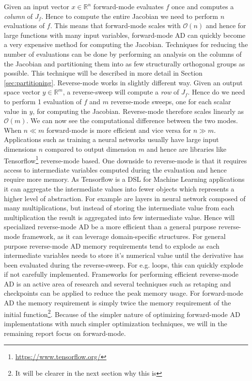     Given an input vector $x \in \mathbb{R}^n$  forward-mode evaluates $f$ once and
	computes a \emph{column} of $J_f$. Hence to compute the entire Jacobian we need 
	to perform $n$ evaluations of $f$. This means that forward-mode scales with $\mathcal{O}(n)$
	and hence for  large functions with many input variables, forward-mode AD can quickly become a very 
	expensive method for computing the Jacobian. 
	Techniques for reducing the number of evaluations can be done by performing an
	analysis on the columns of the Jacobian and partitioning them into as few structurally orthogonal groups as
	possible.
	This technique will be described in more detail in Section \ref{sec:partitioning}.\newline 
	Reverse-mode works in slightly different way. 
	Given an output space vector $y
	\in \mathbb{R}^m$, a reverse-sweep will compute a
	\emph{row} of $J_f$. Hence do we need to perform 1 evaluation of $f$ and $m$
	reverse-mode sweeps, one for each scalar value in $y$, for computing the Jacobian. 
	Reverse-mode therefore scales linearly as $\mathcal{O}(m)$.  
	We can now see the computational difference between the two modes. When $n \ll m$ forward-mode is
	more efficient and vice versa for $n \gg m$.
	Applications such as training a neural networks usually have large input
	dimensions $n$ compared to output dimension $m$ and hence are
	libraries like Tensorflow\footnote{\url{https://www.tensorflow.org/}}
	reverse-mode based. One downside to reverse-mode is that
	it requires access to intermediate variables computed during the evaluation and
	hence require more memory. As Tensorflow is a DSL for Machine Learning applications
	it can aggregate the intermediate values into fewer objects which represents a
	higher level of abstraction. For example are layers in neural network composed of
	many multiplications, but instead of storing the intermediate value from each multiplication
	the result is aggregated into few intermediate value. Hence will specialized reverse-mode AD
	be a more efficient than a general purpose reverse-mode framework, as it can leverage
	domain-specific structures. For general purpose reverse-mode AD memory requirements
	tend to explode as each intermediate variables needs to store it's numerical value until the derivative
	has been evaluated during the reverse-sweep. 
	For e.g. loops, this can quickly explode if not carefully implemented.  
	Frameworks for performing efficient reverse-mode AD is an active area of research 
	and several techniques such as retaping and checkpoints\cite{Margossian2018ARO} 
	can be applied to reduce the peak memory usage. \newline 	
	For forward-mode AD the memory requirement is simply twice the memory
	requirement of the initial function\footnote{It will be clearer in the next section why this is}. 
	Because of the simpler nature of optimizing forward-mode AD implementations with much simpler 
	optimization techniques, we will in the remaining report focus on forward-mode. 

